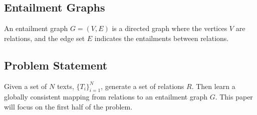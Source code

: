 \subsection{Entailment Graphs}
An entailment graph $G=(V,E)$ is a directed graph where the vertices $V$
are relations, and the edge set $E$ indicates the entailments between
relations.
\subsection{Problem Statement}
Given a set of $N$ texts, $\{T_i\}_{i=1}^{N}$, generate a set of 
relations $R$. Then learn a globally consistent mapping
from relations to an entailment graph $G$. This paper will focus
on the first half of the problem.


